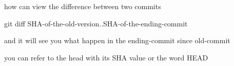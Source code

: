 how can view the difference between two commits 

git diff SHA-of-the-old-version..SHA-of-the-ending-commit 

and it will see you what happen in the ending-commit since old-commit 

you can refer to the head with its SHA value or the word HEAD 
